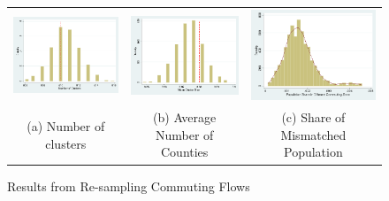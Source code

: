 \begin{figure}
\caption{Results from Re-sampling Commuting Flows  \label{fig:sensitivity}}
\begin{tabular}{ccc}
\includegraphics[scale=.15]{./figures/numclusters_jtw1990.png}& 
\includegraphics[scale=.15]{./figures/meanclussize_jtw1990.png}&
\includegraphics[scale=.15]{./figures/mismatch_jtw1990.png} \\ 
(a) Number of clusters & (b) Average Number of Counties & (c) Share of Mismatched Population \\
\end{tabular}
\end{figure}

